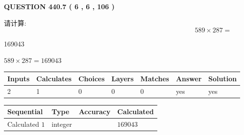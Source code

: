 \documentclass{ctexart}
\begin{document}
   
  
\vspace{0.2in}
  
{\textbf{\Large{QUESTION
440.7 
 ( 6 , 6 , 106 )
}}}
  
  
 
请计算:
\begin{equation}
589  \times    %
287 = \nonumber
\end{equation}
 
 
 
\noindent{}
 
 

169043
 
 
\noindent{}
 
 

 
 
 
\noindent{}
 
 

$ %
589 \times  %
287=   %
169043$
 
 
\noindent{}
 
 

 
   
   
   
   
\noindent\begin{tabular}{|l|l|l|l|l|l|l|}
 \hline
Inputs & Calculates & Choices & Layers & Matches & Answer & Solution \\ \hline
 2  & 
 1  & 
 0
  & 
 0  & 
 0  & 
  yes & 
  yes 
  \\ \hline
 \end{tabular}
   
   
   
   
\noindent{}
   
   
  
  
\noindent\begin{tabular}{|l|l|l|l|}
\hline
 Sequential & Type & Accuracy & Calculated \\ 
\hline
 
 
  Calculated $  1 $ & integer &  & 
  $ 169043 $ 
 \\  \hline  
 \end{tabular}
   
\end{document}
